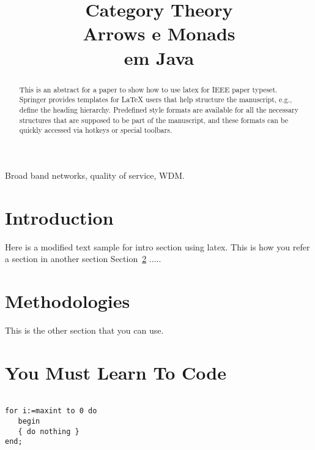 \documentclass[10pt, conference]{IEEEtran}
\begin{document}
\title { 
	Category Theory \\
	Arrows e Monads \\
	em Java 
}

\author {


	\and	
	
}
					  
\maketitle

\begin{abstract}

This is an abstract for a paper to show how to use latex for IEEE paper typeset. Springer provides templates for LaTeX users that help structure the manuscript, e.g., define the heading hierarchy. Predefined style formats are available for all the necessary structures that are supposed to be part of the manuscript, and these formats can be quickly accessed via hotkeys or special toolbars.

\end{abstract}

\begin{IEEEkeywords}

Broad band networks, quality of service, WDM. 

\end{IEEEkeywords}

\section{Introduction}
\label{sec:intro}

Here is a modified text sample for intro section using latex. This is how you refer a section in another section Section~\ref{sec:meth} ..... \cite{jsr335}

\section{Methodologies}
\label{sec:meth}

This is the other section that you can use.

\section{You Must Learn To Code}

\begin{lstlisting}[frame=single]

for i:=maxint to 0 do
   begin
   { do nothing }
end;

\end{lstlisting}

  

\end{document}
